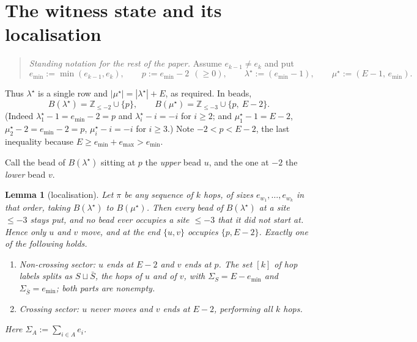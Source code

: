 \documentclass[11pt]{article}
\newtheorem{lemma}[theorem]{Lemma}
\theoremstyle{definition}
\newcommand{\Z}{\mathbb{Z}}
\begin{document}
\section{The witness state and its localisation}

\begin{quote}
\emph{Standing notation for the rest of the paper.}  Assume $e_{k-1}\ne e_k$ and put
\[
  e_{\min}:=\min(e_{k-1},e_k),\qquad p:=e_{\min}-2\ \ (\ge0),\qquad
  \lambda^\star:=(e_{\min}-1),\qquad \mu^\star:=(E-1,\,e_{\min}).
\]
\end{quote}
Thus $\lambda^\star$ is a single row and $|\mu^\star|=|\lambda^\star|+E$, as required.
In beads,
\[
  B(\lambda^\star)=\Z_{\le-2}\cup\{p\},\qquad
  B(\mu^\star)=\Z_{\le-3}\cup\{p,\ E-2\} .
\]
(Indeed $\lambda^\star_1-1=e_{\min}-2=p$ and $\lambda^\star_i-i=-i$ for $i\ge2$; and
$\mu^\star_1-1=E-2$, $\mu^\star_2-2=e_{\min}-2=p$, $\mu^\star_i-i=-i$ for $i\ge3$.)
Note $-2<p<E-2$, the last inequality because $E\ge e_{\min}+e_{\max}>e_{\min}$.

Call the bead of $B(\lambda^\star)$ sitting at $p$ the \emph{upper} bead $u$, and the
one at $-2$ the \emph{lower} bead $v$.

\begin{lemma}[localisation]\label{lem:loc}
Let $\pi$ be any sequence of $k$ hops, of sizes $e_{w_1},\dots,e_{w_k}$ in that order,
taking $B(\lambda^\star)$ to $B(\mu^\star)$.  Then every bead of $B(\lambda^\star)$ at a
site $\le-3$ stays put, and no bead ever occupies a site $\le-3$ that it did not
start at.  Hence only $u$ and $v$ move, and at the end $\{u,v\}$ occupies $\{p,E-2\}$.
Exactly one of the following holds.
\begin{enumerate}
\item[\textbf{(NC)}] \emph{Non-crossing sector:} $u$ ends at $E-2$ and $v$ ends at $p$.
  The set $[k]$ of hop labels splits as $S\sqcup\bar S$, the hops of $u$ and of $v$,
  with $\Sigma_S=E-e_{\min}$ and $\Sigma_{\bar S}=e_{\min}$; both parts are nonempty.
\item[\textbf{(C)}] \emph{Crossing sector:} $u$ never moves and $v$ ends at $E-2$,
  performing all $k$ hops.
\end{enumerate}
Here $\Sigma_A:=\sum_{i\in A}e_i$.
\end{lemma}
\end{document}
